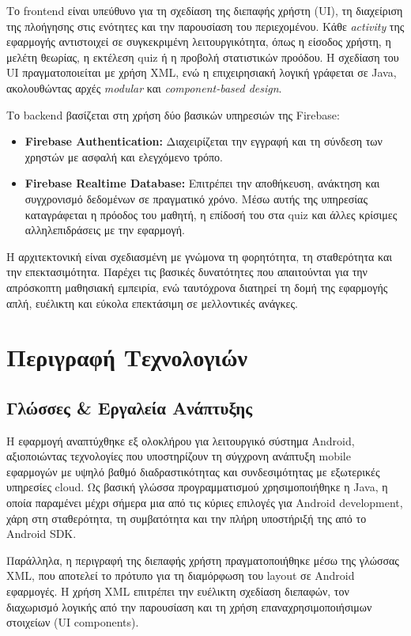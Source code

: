 \documentclass[11pt]{report}
\begin{document}
Το frontend είναι υπεύθυνο για τη σχεδίαση της διεπαφής χρήστη (UI), τη διαχείριση της πλοήγησης στις ενότητες και την παρουσίαση του περιεχομένου. Κάθε \textit{activity} της εφαρμογής αντιστοιχεί σε συγκεκριμένη λειτουργικότητα, όπως η είσοδος χρήστη, η μελέτη θεωρίας, η εκτέλεση quiz ή η προβολή στατιστικών προόδου. Η σχεδίαση του UI πραγματοποιείται με χρήση XML, ενώ η επιχειρησιακή λογική γράφεται σε Java, ακολουθώντας αρχές \textit{modular} και \textit{component-based design}.

Το backend βασίζεται στη χρήση δύο βασικών υπηρεσιών της Firebase:

\begin{itemize}
    \item \textbf{Firebase Authentication:} Διαχειρίζεται την εγγραφή και τη σύνδεση των χρηστών με ασφαλή και ελεγχόμενο τρόπο.
    
    \item \textbf{Firebase Realtime Database:} Επιτρέπει την αποθήκευση, ανάκτηση και συγχρονισμό δεδομένων σε πραγματικό χρόνο. Μέσω αυτής της υπηρεσίας καταγράφεται η πρόοδος του μαθητή, η επίδοσή του στα quiz και άλλες κρίσιμες αλληλεπιδράσεις με την εφαρμογή.
\end{itemize}

Η αρχιτεκτονική είναι σχεδιασμένη με γνώμονα τη φορητότητα, τη σταθερότητα και την επεκτασιμότητα. Παρέχει τις βασικές δυνατότητες που απαιτούνται για την απρόσκοπτη μαθησιακή εμπειρία, ενώ ταυτόχρονα διατηρεί τη δομή της εφαρμογής απλή, ευέλικτη και εύκολα επεκτάσιμη σε μελλοντικές ανάγκες.


\chapter{Περιγραφή Τεχνολογιών}
\section{Γλώσσες \& Εργαλεία Ανάπτυξης}

Η εφαρμογή αναπτύχθηκε εξ ολοκλήρου για λειτουργικό σύστημα Android, αξιοποιώντας τεχνολογίες που υποστηρίζουν τη σύγχρονη ανάπτυξη mobile εφαρμογών με υψηλό βαθμό διαδραστικότητας και συνδεσιμότητας με εξωτερικές υπηρεσίες cloud. Ως βασική γλώσσα προγραμματισμού χρησιμοποιήθηκε η Java, η οποία παραμένει μέχρι σήμερα μια από τις κύριες επιλογές για Android development, χάρη στη σταθερότητα, τη συμβατότητα και την πλήρη υποστήριξή της από το Android SDK. 

Παράλληλα, η περιγραφή της διεπαφής χρήστη πραγματοποιήθηκε μέσω της γλώσσας XML, που αποτελεί το πρότυπο για τη διαμόρφωση του layout σε Android εφαρμογές. Η χρήση XML επιτρέπει την ευέλικτη σχεδίαση διεπαφών, τον διαχωρισμό λογικής από την παρουσίαση και τη χρήση επαναχρησιμοποιήσιμων στοιχείων (UI components). 
\end{document}
